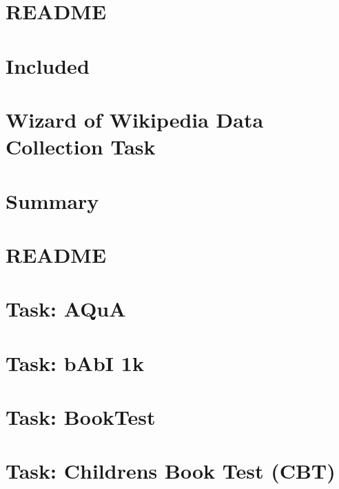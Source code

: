 \documentclass[twoside]{book}
\newcommand{\+}{\discretionary{\mbox{\scriptsize$\hookleftarrow$}}{}{}}
\begin{document}
\chapter{R\+E\+A\+D\+ME}
\label{md_parlai_mturk_tasks_personachat_README}

\chapter{Included}
\label{md_parlai_mturk_tasks_README}

\chapter{Wizard of Wikipedia Data Collection Task}
\label{md_parlai_mturk_tasks_wizard_of_wikipedia_README}

\chapter{Summary}
\label{md_parlai_mturk_webapp_README}

\chapter{R\+E\+A\+D\+ME}
\label{md_parlai_README}

\chapter{Task\+: A\+QuA}
\label{md_parlai_tasks_aqua_README}

\chapter{Task\+: b\+AbI 1k}
\label{md_parlai_tasks_babi_README}

\chapter{Task\+: Book\+Test}
\label{md_parlai_tasks_booktest_README}

\chapter{Task\+: Children\textquotesingle{}s Book Test (C\+BT)}
\label{md_parlai_tasks_cbt_README}

\end{document}
